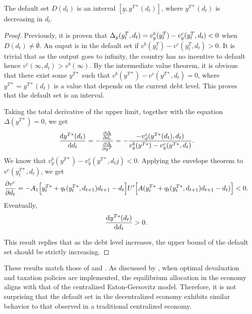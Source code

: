 \begin{proposition}
 The default set $D(d_t)$ is an interval $[\underline{y}, y^{T*}(d_t)]$, where $y^{T*}(d_t)$ is decreasing in $d_t$.
\end{proposition}
\begin{proof}
    Previously, it is proven that $\Delta_y(y^T_{t}, d_t) = v^b_y(y^T_{t}) - v^c_y(y^T_t, d_t) < 0$ when $D(d_t) \ne \emptyset$. An ouput is in the default set if $v^b(y^T_t) - v^c(y^T_t, d_t) >0$. It is trivial that as the output goes to infinity, the country has no incentive to default hence $v^c(\infty, d_t) > v^b(\infty)$. By the intermediate value theorem, it is obvious that there exist some $y^{T*}$ such that $v^b(y^{T*}) - v^c(y^{T*}, d_t) = 0$, where $y^{T*} = y^{T*}(d_t)$ is a value that depends on the current debt level. This proves that the default set is an interval.

    Taking the total derivative of the upper limit, together with the equation $\Delta(y^{T*}) = 0$, we get
    \begin{equation*}
        \dv{y^{T*}(d_t)}{d_t} = - \frac{\pdv{\Delta}{d_t}}{\pdv{\Delta}{y^{T}}} = - \frac{-v^c_d(y^{T*}(d_t), d_t)}{v^b_y(y^{T*}) - v^c_y(y^{T*}, d_t)}.
    \end{equation*}
    We know that $v^b_y(y^{T*}) - v^c_y(y^{T*}, d_tj) < 0$. Applying the envelope theorem to $v^c(y^{T*}_t, d_t)$, we get
    \begin{equation*}
        \pdv{v^c}{d_t} = -A_1\Big[y^{T*}_t + q_t(y^{T*}_t, d_{t+1})d_{t+1} - d_t\Big] U'\Big[A(y^{T*}_t + q_t(y^{T*}_t, d_{t+1})d_{t+1} - d_t)\Big]<0.
    \end{equation*}
    Eventually,
    \begin{equation}
        \dv{y^{T*}(d_t)}{d_t} > 0.
    \end{equation}

    This result replies that as the debt level increases, the upper bound of the default set should be strictly increasing.
\end{proof}

These results match those of \citet{Arellano-08} and \citet{Uribe-Schmitt-Grohe-textbook}. As discussed by \citet{Na-18}, when optimal devaluation and taxation policies are implemented, the equilibrium allocation in the economy aligns with that of the centralized Eaton-Gersovitz model. Therefore, it is not surprising that the default set in the decentralized economy exhibits similar behavior to that observed in a traditional centralized economy.
